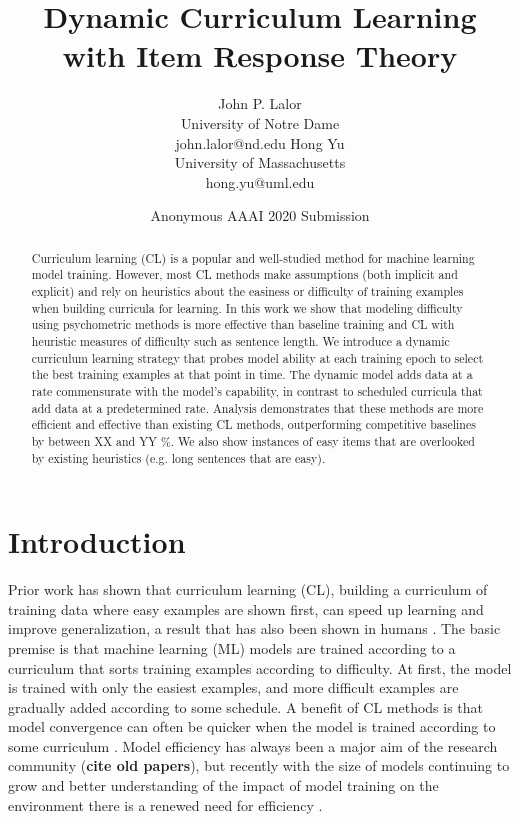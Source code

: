 \documentclass[letterpaper]{article} %
\title{Dynamic Curriculum Learning with Item Response Theory}
\author{
	John P. Lalor \\
	University of Notre Dame \\
	john.lalor@nd.edu
	\And 
	Hong Yu \\
	University of Massachusetts \\
	hong.yu@uml.edu
}
\author{
	Anonymous AAAI 2020 Submission
}
\begin{document}
\maketitle 
\begin{abstract}
	Curriculum learning (CL) is a popular and well-studied method for machine learning model training.
	However, most CL methods make assumptions (both implicit and explicit) and rely on heuristics about the easiness or difficulty of training examples when building curricula for learning.
	In this work we show that modeling difficulty using psychometric methods is more effective than baseline training and CL with heuristic measures of difficulty such as sentence length.
	We introduce a dynamic curriculum learning strategy that probes model ability at each training epoch to select the best training examples at that point in time.
	The dynamic model adds data at a rate commensurate with the model's capability, in contrast to scheduled curricula that add data at a predetermined rate.
	Analysis demonstrates that these methods are more efficient and effective than existing CL methods, outperforming competitive baselines by between XX and YY \%.  
	We also show instances of easy items that are overlooked by existing heuristics (e.g. long sentences that are easy).
\end{abstract}

\section{Introduction}
Prior work has shown that curriculum learning (CL), building a curriculum of training data where easy examples are shown first, can speed up learning and improve generalization, a result that has also been shown in humans \cite{bengio_curriculum_2009,amiri_repeat_2017,platanios_competence-based_2019}. 
The basic premise is that machine learning (ML) models are trained according to a curriculum that sorts training examples according to difficulty.
At first, the model is trained with only the easiest examples, and more difficult examples are gradually added according to some schedule.
A benefit of CL methods is that model convergence can often be quicker when the model is trained according to some curriculum \cite{bengio_curriculum_2009,platanios_competence-based_2019}.
Model efficiency has always been a major aim of the research community (\textbf{cite old papers}), but recently with the size of models continuing to grow and better understanding of the impact of model training on the environment there is a renewed need for efficiency \cite{strubell_energy_2019}.
\end{document}
